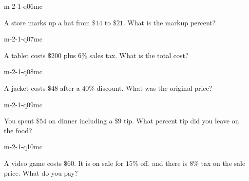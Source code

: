 \begin{practiceQuestion}{m-2-1-q06}{mc}
\begin{questionText}
A store marks up a hat from $\$14$ to $\$21$. What is the markup percent?
\end{questionText}
\end{practiceQuestion}

\begin{practiceQuestion}{m-2-1-q07}{mc}
\begin{questionText}
A tablet costs $\$200$ plus $6\%$ sales tax. What is the total cost?
\end{questionText}
\end{practiceQuestion}

\begin{practiceQuestion}{m-2-1-q08}{mc}
\begin{questionText}
A jacket costs $\$48$ after a $40\%$ discount. What was the original price?
\end{questionText}
\end{practiceQuestion}

\begin{practiceQuestion}{m-2-1-q09}{mc}
\begin{questionText}
You spent $\$54$ on dinner including a $\$9$ tip. What percent tip did you leave on the food?
\end{questionText}
\end{practiceQuestion}

\begin{practiceQuestion}{m-2-1-q10}{mc}
\begin{questionText}
A video game costs $\$60$. It is on sale for $15\%$ off, and there is $8\%$ tax on the sale price. What do you pay?
\end{questionText}
\end{practiceQuestion}

